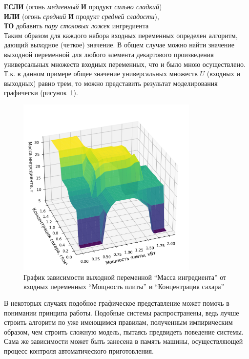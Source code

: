 \documentclass[a4paper,12pt]{article}
\begin{document}
	\textbf{ЕСЛИ} (огонь \textit{медленный} \textbf{И} продукт \textit{сильно сладкий})\\ \textbf{ИЛИ} (огонь \textit{средний} \textbf{И} продукт \textit{средней сладости}),\\ \textbf{ТО} добавить \textit{пару столовых ложек} ингредиента
	\\
	
	Таким образом для каждого набора входных переменных определен алгоритм, дающий выходное (четкое) значение. В общем случае можно найти значение выходной переменной для любого элемента декартового произведения универсальных множеств входных переменных, что и было мною осуществлено. Т.к. в данном примере общее значение универсальных множеств $U$ (входных и выходных) равно трем, то можно представить результат моделирования графически (рисунок~\ref{fig:4_1}).
	
	\begin{figure}[h]
		\centering
		\includegraphics[width=0.8\textwidth]{Figure_4_1}
		\caption{График зависимости выходной переменной ``Масса ингредиента'' от входных переменных ``Мощность плиты'' и ``Концентрация сахара''}
		\label{fig:4_1}
	\end{figure}

	В некоторых случаях подобное графическое представление может помочь в понимании принципа работы. Подобные системы распространены, ведь лучше строить алгоритм по уже имеющимся правилам, полученным импирическим образом, чем строить сложную модель, пытаясь предвидеть поведение системы. Сама же зависимости может быть занесена в память машины, осуществляющей процесс контроля автоматического приготовления.
	
\end{document}
